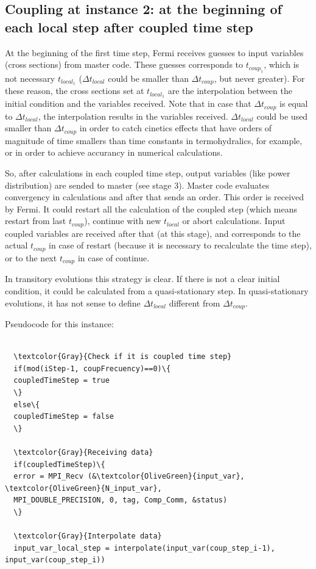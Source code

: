 \subsection*{Coupling at instance 2: at the beginning of each local step after coupled time step}

At the beginning of the first time step, Fermi receives guesses to input variables (cross sections) from master code.
These guesses corresponds to $t_{coup_1}$, which is not necessary $t_{local_1}$
($\Delta t_{local}$ could be smaller than $\Delta t_{coup}$, but never greater).
For these reason, the cross sections set at $t_{local_1}$ are the interpolation between the initial condition and the variables received.
Note that in case that $\Delta t_{coup}$ is equal to $\Delta t_{local}$, the interpolation results in the variables received.
$\Delta t_{local}$ could be used smaller than $\Delta t_{coup}$
in order to catch cinetics effects that have orders of magnitude of time smallers than time constants in termohydralics, for example,
or in order to achieve accurancy in numerical calculations.

So, after calculations in each coupled time step, output variables (like power distribution) are sended to master (see stage 3).
Master code evaluates convergency in calculations and after that sends an order.
This order is received by Fermi.
It could restart all the calculation of the coupled step (which means restart from last $t_{coup}$),
continue with new $t_{local}$ or abort calculations.
Input coupled variables are received after that (at this stage),
and corresponds to the actual $t_{coup}$ in case of restart (because it is necessary to recalculate the time step),
or to the next $t_{coup}$ in case of continue.

In transitory evolutions this strategy is clear.
If there is not a clear initial condition, it could be calculated from a quasi-stationary step.
In quasi-stationary evolutions, it has not sense to define $\Delta t_{local}$ different from $\Delta t_{coup}$.

Pseudocode for this instance:

\begin{Verbatim}[frame=single,commandchars=\\\{\}]

  \textcolor{Gray}{Check if it is coupled time step}
  if(mod(iStep-1, coupFrecuency)==0)\{
  coupledTimeStep = true
  \}
  else\{
  coupledTimeStep = false
  \}

  \textcolor{Gray}{Receiving data}
  if(coupledTimeStep)\{
  error = MPI_Recv (&\textcolor{OliveGreen}{input_var}, \textcolor{OliveGreen}{N_input_var},
  MPI_DOUBLE_PRECISION, 0, tag, Comp_Comm, &status)
  \}

  \textcolor{Gray}{Interpolate data}
  input_var_local_step = interpolate(input_var(coup_step_i-1), input_var(coup_step_i))

\end{Verbatim}


